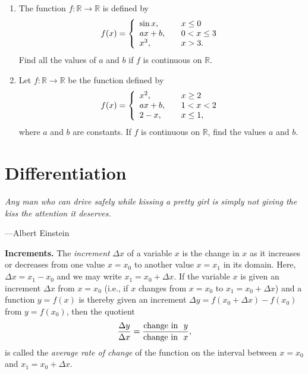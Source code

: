 \documentclass[titlepage,a4paper,12pt]{report}
\begin{document}
\begin{enumerate}
\[\begin{array}{l l}
  Ax-B, & \quad x\leq -1\\
  2x^2+3Ax+B, & \quad -1<x\leq 1\\
  4, & \quad x >1.\\ \end{array} \right. \]
  \item The function $f:\mathbb{R} \to \mathbb{R}$ is defined by 
  \[f(x) = \left\{ 
\begin{array}{l l}
 \sin x, & \quad x\leq 0\\
  ax+b, & \quad 0<x \leq 3\\
  x^3, & \quad x >3.\\ \end{array} \right. \]
  Find all the values of $a$ and $b$ if $f$ is continuous on $\mathbb{R}$.
  \item Let $f:\mathbb{R} \to \mathbb{R}$ be the function defined by 
  \[f(x) = \left\{ 
\begin{array}{l l}
  x^2, & \quad x\geq 2\\
  ax+b, & \quad 1<x<2\\
  2-x, & \quad x\leq 1,\\ \end{array} \right. \]
  where $a$ and $b$ are constants. If $f$ is continuous on $\mathbb{R}$, find the values $a$ and $b$.
\end{enumerate}
\chapter{Differentiation}
\begin{center}
	\small{\parbox{18cm}{
		\begin{raggedright}
		{\small
		\textit{Any man who can drive safely while kissing a pretty girl is simply not giving the kiss the attention it deserves.}
 }
 
				\vspace{.5cm}\hfill{---Albert Einstein }
		\end{raggedright}
	}
} 
\end{center}
\textbf{Increments.} The \textit{increment} $\Delta x$ of a variable $x$ is the change in $x$ as it increases or decreases from one value $x=x_0$ to another value $x=x_1$ in its domain. Here, $\Delta x=x_1-x_0$ and we may write $x_1=x_0+\Delta x$. If the variable $x$ is given an increment $\Delta x$ from $x=x_0$ (i.e., if $x$ changes from $x=x_0$ to $x_1=x_0+\Delta x$) and a function $y=f(x)$ is thereby given an increment $\Delta y=f(x_0+\Delta x)-f(x_0)$ from $y=f(x_0)$, then the quotient 
\begin{equation*}
\dfrac{\Delta y} {\Delta x}=\dfrac{\hbox{change in}~~ y}{\hbox{change in }~ x}, 
\end{equation*}
is called the \textit{average rate of change} of the function on the interval between $x=x_0$ and $x_1=x_0+\Delta x$.
 
\end{document}
